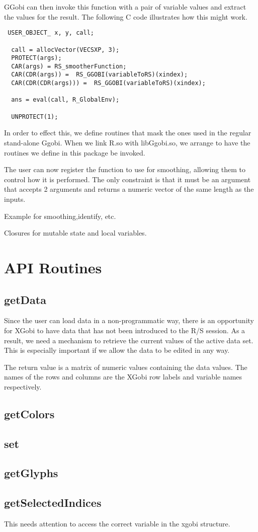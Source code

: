 GGobi can then invoke this function with a pair of variable values and
extract the values for the result.
The following C code illustrates how this might work.
\begin{verbatim}
 USER_OBJECT_ x, y, call;

  call = allocVector(VECSXP, 3);
  PROTECT(args);
  CAR(args) = RS_smootherFunction;
  CAR(CDR(args)) =  RS_GGOBI(variableToRS)(xindex);
  CAR(CDR(CDR(args))) =  RS_GGOBI(variableToRS)(xindex);
 
  ans = eval(call, R_GlobalEnv);

  UNPROTECT(1);
\end{verbatim}



In order to effect this, we define routines that mask the ones used in
the regular stand-alone Ggobi.  When we link R.so with libGgobi.so, we
arrange to have the routines we define in this package be invoked.


The user can now register the function to use for smoothing, allowing
them to control how it is performed. The only constraint is that it
must be an argument that accepts 2 arguments and returns a numeric
vector of the same length as the inputs.





Example for smoothing,identify, etc.

Closures for mutable state and local variables.




\section{API Routines}

\subsection{getData}
Since the user can load data in a non-programmatic way, there is an
opportunity for XGobi to have data that has not been introduced to the
R/S session.  As a result, we need a mechanism to retrieve the current
values of the active data set.  This is especially important if we
allow the data to be edited in any way.

The return value is a matrix of numeric values containing the data
values.  The names of the rows and columns are the XGobi row labels
and variable names respectively.


\subsection{getColors}


\subsection{set}

\subsection{getGlyphs}


\subsection{getSelectedIndices}
This needs attention to access the correct
variable in the xgobi structure.
